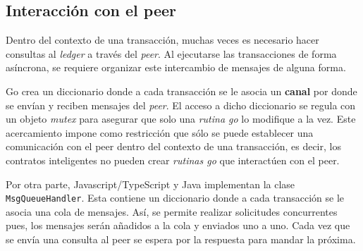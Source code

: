 \subsection{Interacción con el peer} 
Dentro del contexto de una transacción, muchas veces es necesario hacer consultas al \textit{ledger} a través del \textit{peer}. Al ejecutarse las transacciones de forma asíncrona, se requiere organizar este intercambio de mensajes de alguna forma. 

Go crea un diccionario donde a cada transacción se le asocia un \textbf{canal} por donde se envían y reciben mensajes del \textit{peer}. El acceso a dicho diccionario se regula con un objeto \textit{mutex} para asegurar que solo una \textit{rutina go} lo modifique a la vez. Este acercamiento impone como restricción que sólo se puede establecer una comunicación con el peer dentro del contexto de una transacción, es decir, los contratos inteligentes no pueden crear \textit{rutinas go} que interactúen con el peer.

Por otra parte, Javascript/TypeScript y Java implementan la clase \texttt{MsgQueueHandler}. Esta contiene un diccionario donde a cada transacción se le asocia una cola de mensajes. Así, se permite realizar solicitudes concurrentes pues, los mensajes serán añadidos a la cola y enviados uno a uno. Cada vez que se envía una consulta al peer se espera por la respuesta para mandar la próxima.


%

